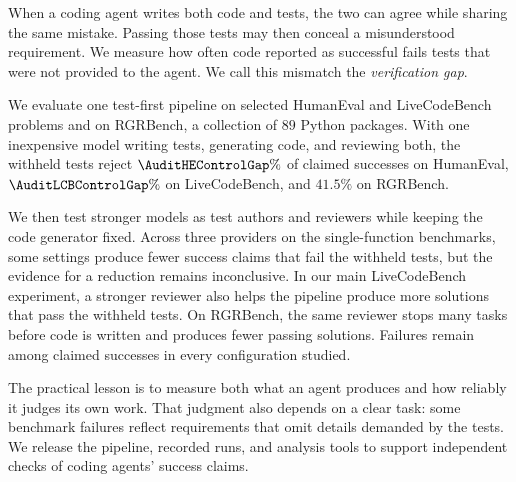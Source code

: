 When a coding agent writes both code and tests, the two can agree while sharing the same
mistake. Passing those tests may then conceal a misunderstood requirement. We measure how
often code reported as successful fails tests that were not provided to the agent. We call this
mismatch the \emph{verification gap}.

We evaluate one test-first pipeline on selected HumanEval and LiveCodeBench problems and on
RGRBench, a collection of $89$ Python packages. With one inexpensive model writing tests,
generating code, and reviewing both, the withheld tests reject $\AuditHEControlGap\%$ of
claimed successes on HumanEval, $\AuditLCBControlGap\%$ on LiveCodeBench, and $41.5\%$ on
RGRBench.

We then test stronger models as test authors and reviewers while keeping the code generator
fixed. Across three providers on the single-function benchmarks, some settings produce fewer
success claims that fail the withheld tests, but the evidence for a reduction remains inconclusive.
In our main LiveCodeBench experiment, a stronger reviewer also helps the pipeline produce
more solutions that pass the withheld tests. On RGRBench, the same reviewer stops many tasks
before code is written and produces fewer passing solutions. Failures remain among claimed
successes in every configuration studied.

The practical lesson is to measure both what an agent produces and how reliably it judges
its own work. That judgment also depends on a clear task: some benchmark failures reflect
requirements that omit details demanded by the tests. We release the pipeline, recorded
runs, and analysis tools to support independent checks of coding agents' success claims.
